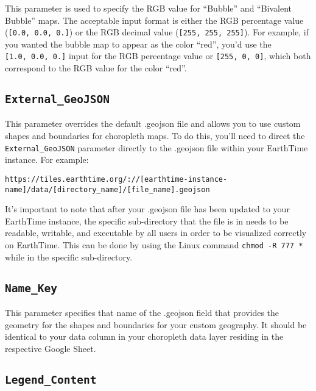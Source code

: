 \documentclass[
]{krantz}
\begin{document}
This parameter is used to specify the RGB value for ``Bubble'' and ``Bivalent Bubble'' maps. The acceptable input format is either the RGB percentage value (\texttt{{[}0.0,\ 0.0,\ 0.{]}}) or the RGB decimal value (\texttt{{[}255,\ 255,\ 255{]}}). For example, if you wanted the bubble map to appear as the color ``red'', you'd use the \texttt{{[}1.0,\ 0.0,\ 0.{]}} input for the RGB percentage value or \texttt{{[}255,\ 0,\ 0{]}}, which both correspond to the RGB value for the color ``red''.

\hypertarget{external_geojson}{%
\subsection*{\texorpdfstring{\texttt{External\_GeoJSON}}{External\_GeoJSON}}\label{external_geojson}}


This parameter overrides the default .geojson file and allows you to use custom shapes and boundaries for choropleth maps. To do this, you'll need to direct the \texttt{External\_GeoJSON} parameter directly to the .geojson file within your EarthTime instance. For example:

\texttt{https://tiles.earthtime.org/://{[}earthtime-instance-name{]}/data/{[}directory\_name{]}/{[}file\_name{]}.geojson}

It's important to note that after your .geojson file has been updated to your EarthTime instance, the specific sub-directory that the file is in needs to be readable, writable, and executable by all users in order to be visualized correctly on EarthTime. This can be done by using the Linux command \texttt{chmod\ -R\ 777\ *} while in the specific sub-directory.

\hypertarget{name_key}{%
\subsection*{\texorpdfstring{\texttt{Name\_Key}}{Name\_Key}}\label{name_key}}


This parameter specifies that name of the .geojson field that provides the geometry for the shapes and boundaries for your custom geography. It should be identical to your data column in your choropleth data layer residing in the respective Google Sheet.

\hypertarget{legend_content}{%
\subsection*{\texorpdfstring{\texttt{Legend\_Content}}{Legend\_Content}}\label{legend_content}}
\end{document}
